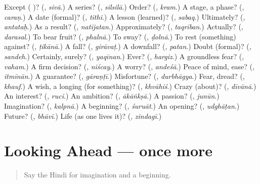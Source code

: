 \begin{tcolorbox}[breakable,colback=teal!4,colframe=teal!35!black,title={Before you move on}]
Except ( )? (\textbf{}, \emph{sivā}.) A series? (\textbf{}, \emph{silsilā}.) Order? (\textbf{}, \emph{kram}.) A stage, a phase? (\textbf{}, \emph{caraṇ}.) A date (formal)? (\textbf{}, \emph{tithi}.) A lesson (learned)? (\textbf{}, \emph{sabaq}.) Ultimately? (\textbf{}, \emph{antataḥ}.) As a result? (\textbf{}, \emph{natījatan}.) Approximately? (\textbf{}, \emph{taqrīban}.) Actually? (\textbf{}, \emph{darasal}.) To bear fruit? (\textbf{}, \emph{phalnā}.) To sway? (\textbf{}, \emph{ḍolnā}.) To rest (something) against? (\textbf{}, \emph{ṭikānā}.) A fall? (\textbf{}, \emph{girāvaṭ}.) A downfall? (\textbf{}, \emph{patan}.) Doubt (formal)? (\textbf{}, \emph{sandeh}.) Certainly, surely? (\textbf{}, \emph{yaqīnan}.) Ever? (\textbf{}, \emph{hargiz}.) A groundless fear? (\textbf{}, \emph{vaham}.) A firm decision? (\textbf{}, \emph{niścay}.) A worry? (\textbf{}, \emph{andeśā}.) Peace of mind, ease? (\textbf{}, \emph{itmīnān}.) A guarantee? (\textbf{}, \emph{gāraṇṭī}.) Misfortune? (\textbf{}, \emph{durbhāgya}.) Fear, dread? (\textbf{}, \emph{khauf}.) A wish, a longing (for something)? (\textbf{}, \emph{khvāhiś}.) Crazy (about)? (\textbf{}, \emph{dīvānā}.) An interest? (\textbf{}, \emph{ruci}.) An ambition? (\textbf{}, \emph{ākāṅkṣā}.) A passion? (\textbf{}, \emph{junūn}.) Imagination? (\textbf{}, \emph{kalpnā}.) A beginning? (\textbf{}, \emph{śuruāt}.) An opening? (\textbf{}, \emph{udghāṭan}.) Future? (\textbf{}, \emph{bhāvī}.) Life (as one lives it)? (\textbf{}, \emph{zindagī}.)
\end{tcolorbox}
\section[(dialogue)]{Looking Ahead — once more}

\label{lesson:HI-R559-review-final-559}



\begin{quote}
Say the Hindi for imagination and a beginning.
\end{quote}

